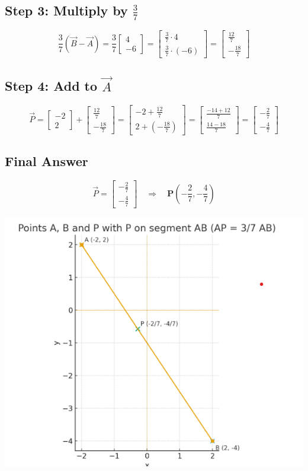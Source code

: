 \documentclass[journal]{IEEEtran}
\begin{document}
\subsection*{Step 3: Multiply by $\frac{3}{7}$}
\[
\frac{3}{7}(\vec{B}-\vec{A}) =
\frac{3}{7} \begin{bmatrix}4 \\ -6\end{bmatrix} =
\begin{bmatrix}
\frac{3}{7} \cdot 4 \\
\frac{3}{7} \cdot (-6)
\end{bmatrix} =
\begin{bmatrix}
\frac{12}{7} \\
-\frac{18}{7}
\end{bmatrix}
\]

\subsection*{Step 4: Add to $\vec{A}$}
\[
\vec{P} = 
\begin{bmatrix}-2 \\ 2\end{bmatrix} +
\begin{bmatrix}\frac{12}{7} \\ -\frac{18}{7}\end{bmatrix} =
\begin{bmatrix}
-2 + \frac{12}{7} \\
2 + \left(-\frac{18}{7}\right)
\end{bmatrix} =
\begin{bmatrix}
\frac{-14 + 12}{7} \\
\frac{14 - 18}{7}
\end{bmatrix} =
\begin{bmatrix}
-\frac{2}{7} \\
-\frac{4}{7}
\end{bmatrix}
\]

\subsection*{Final Answer}
\[
\vec{P} = 
\begin{bmatrix}-\frac{2}{7} \\ -\frac{4}{7}\end{bmatrix}
\quad\Rightarrow\quad
\textbf{P}\left(-\frac{2}{7}, -\frac{4}{7}\right)
\]


\begin{center}
    \includegraphics[width=0.6\columnwidth]{figs/fig1.png}
\end{center}
\end{document}
